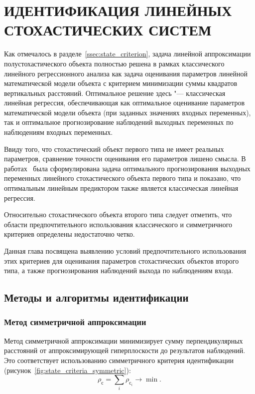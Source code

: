 \chapter[Идентификация линейных стохастических систем]{%
  ИДЕНТИФИКАЦИЯ ЛИНЕЙНЫХ \\
  СТОХАСТИЧЕСКИХ СИСТЕМ
}

Как отмечалось в разделе~\ref{ssec:state_criterion},
задача линейной аппроксимации полустохастического объекта полностью решена в
рамках классического линейного регрессионного анализа как задача оценивания параметров
линейной математической модели объекта с критерием минимизации суммы квадратов вертикальных расстояний.
Оптимальное решение здесь "--- классическая линейная регрессия,
обеспечивающая как оптимальное оценивание параметров математической модели объекта
(при заданных значениях входных переменных),
так и оптимальное прогнозирование наблюдений выходных переменных по наблюдениям входных переменных.

Ввиду того, что стохастический объект первого типа не имеет реальных параметров,
сравнение точности оценивания его параметров лишено смысла.
В работах~\cite{mukha_2010, mukha_2011} была сформулирована задача оптимального прогнозирования
выходных переменных линейного стохастического объекта первого типа и показано,
что оптимальным линейным предиктором также является классическая линейная регрессия.

Относительно стохастического объекта второго типа следует отметить,
что области предпочтительного использования классического и симметричного критериев
определены недостаточно четко.

Данная глава посвящена выявлению условий предпочтительного использования этих критериев
для оценивания параметров стохастических объектов второго типа,
а также прогнозирования наблюдений выхода по наблюдениям входа.

\section{Методы и алгоритмы идентификации}

\subsection{Метод симметричной аппроксимации}\label{ssec:linear_method_symmetric}

Метод симметричной аппроксимации минимизирует сумму перпендикулярных расстояний
от аппроксимирующей гиперплоскости до результатов наблюдений.
Это соответствует использованию симметричного критерия идентификации
(рисунок~\ref{fig:state_criteria_symmetric}):
\begin{equation*}
  \rho_{\text{с}} = \sum_i \rho_{\text{с}_i} \rightarrow \min.
\end{equation*}

